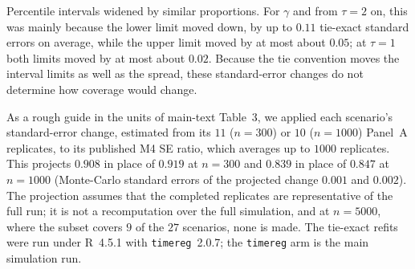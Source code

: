 Percentile intervals widened by similar proportions. For $\gamma$ and from $\tau=2$
on, this was mainly because the lower limit moved down, by up to $0.11$ tie-exact
standard errors on average, while the upper limit moved by at most about $0.05$; at
$\tau=1$ both limits moved by at most about $0.02$. Because the tie convention moves
the interval limits as well as the spread, these standard-error changes do not
determine how coverage would change.

As a rough guide in the units of main-text
Table~3, we applied each scenario's standard-error change, estimated from its $11$
($n=300$) or $10$ ($n=1000$) Panel~A replicates, to its published M4 SE ratio, which
averages up to $1000$ replicates. This projects $0.908$ in place of $0.919$ at
$n=300$ and $0.839$ in place of $0.847$ at $n=1000$ (Monte-Carlo standard errors
of the projected change $0.001$ and $0.002$). The projection assumes that the
completed replicates are representative of the full run; it is not a recomputation over
the full simulation, and at $n=5000$, where the subset covers $9$ of the $27$ scenarios,
none is made. The tie-exact refits were run under
R~4.5.1 with \texttt{timereg}~2.0.7; the \texttt{timereg} arm is the main simulation
run.

